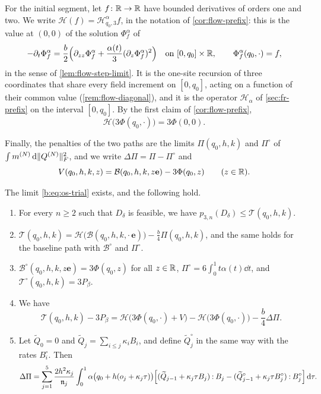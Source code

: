 For the initial segment, let $f\colon\mathbb R\to\mathbb R$ have bounded derivatives of orders
one and two. We write $\mathcal H(f)=\mathcal H^\alpha_{q_0,3}f$, in the notation
of \cref{cor:flow-prefix}: this is the value at $(0,0)$ of the solution
$\Phi^\alpha_f$ of
\[
 -\partial_t\Phi^\alpha_f=\frac b2\Bigl(\partial_{zz}\Phi^\alpha_f+\frac{\alpha(t)}3
 (\partial_z\Phi^\alpha_f)^2\Bigr)\quad\text{on }[0,q_0]\times\mathbb R,\qquad
 \Phi^\alpha_f(q_0,\cdot)=f,
\]
in the sense of \cref{lem:flow-step-limit}. It is the one-site recursion of
three coordinates that share every field increment on $[0,q_0]$, acting on a
function of their common value (\cref{rem:flow-diagonal}), and it is the
operator $\mathcal H_\alpha$ of \cref{sec:fr-prefix} on the interval $[0,q_0]$.
By the first claim of \cref{cor:flow-prefix},
\begin{equation}\label{eq:cub-prefix-scalar}
 \mathcal H\bigl(3\Phi(q_0,\cdot)\bigr)=3\Phi(0,0).
\end{equation}

Finally, the penalties of the two paths are the limits
$\Pi(q_0,h,k)$ and $\Pi^\circ$ of $\int m^{(N)}\,\mathrm d\lVert Q^{(N)}\rVert_F^2$, and
we write $\Delta\Pi=\Pi-\Pi^\circ$ and
\begin{equation}\label{eq:cub-V}
 V(q_0,h,k,z)=\mathcal B(q_0,h,k,z\mathbf e)-3\Phi(q_0,z)\qquad(z\in\mathbb R).
\end{equation}

\begin{lemma}\label{lem:cub-trial}
The limit \eqref{b:eq:os-trial} exists, and the following hold.
\begin{enumerate}[label=\textup{(\alph*)}]
\item For every $n\ge2$ such that $D_\delta$ is feasible, we have
 $p_{3,n}(D_\delta)\le\mathcal T(q_0,h,k)$.
\item $\mathcal T(q_0,h,k)=\mathcal H\bigl(\mathcal B(q_0,h,k,\cdot\,\mathbf e)\bigr)
 -\frac b4\Pi(q_0,h,k)$, and the same holds for the baseline path with
 $\mathcal B^\circ$ and $\Pi^\circ$.
\item $\mathcal B^\circ(q_0,h,k,z\mathbf e)=3\Phi(q_0,z)$ for all $z\in\mathbb R$,
 $\Pi^\circ=6\int_0^1t\alpha(t)\dd t$, and $\mathcal T^\circ(q_0,h,k)=3P_\beta$.
\item We have
 \begin{equation}\label{eq:cub-decomposition}
  \mathcal T(q_0,h,k)-3P_\beta
  =\mathcal H\bigl(3\Phi(q_0,\cdot)+V\bigr)-\mathcal H\bigl(3\Phi(q_0,\cdot)\bigr)
  -\frac b4\Delta\Pi.
 \end{equation}
\item Let $\widetilde Q_0=0$ and $\widetilde Q_j=\sum_{i\le j}\kappa_iB_i$, and
 define $\widetilde Q_j^\circ$ in the same way with the rates $B_i^\circ$. Then
 \begin{equation}\label{eq:cub-penalty}
  \Delta\Pi=\sum_{j=1}^5\frac{2h^2\kappa_j}{\mathfrak n_j}\int_0^1
  \alpha\bigl(q_0+h(o_j+\kappa_j\tau)\bigr)
  \Bigl[(\widetilde Q_{j-1}+\kappa_j\tau B_j)\mathbin:B_j
  -(\widetilde Q_{j-1}^\circ+\kappa_j\tau B_j^\circ)\mathbin:B_j^\circ\Bigr]\,\mathrm d\tau .
 \end{equation}
\end{enumerate}
\end{lemma}

